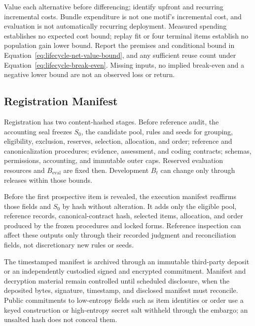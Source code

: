 \documentclass[10pt]{article} %
\providecommand{\1}{\mathbf{1}}  %
\theoremstyle{remark}
\theoremstyle{definition}
\begin{document}
Value each alternative before differencing; identify upfront and recurring
incremental costs. Bundle expenditure is not one motif's incremental cost,
and evaluation is not automatically recurring deployment. Measured spending
establishes no expected cost bound; replay fit or four terminal items establish
no population gain lower bound. Report the premises and conditional bound in
Equation~\ref{eq:lifecycle-net-value-bound}, and any sufficient reuse count
under Equation~\ref{eq:lifecycle-break-even}. Missing inputs, no implied
break-even and a negative lower bound are not an observed loss or return.

\subsection{Registration Manifest}
\label{subsec:ledger-registration}

Registration has two content-hashed stages. Before reference audit, the
accounting seal freezes $S_0$, the candidate pool, rules and seeds for grouping,
eligibility, exclusion, reserves, selection, allocation, and order; reference
and canonicalization procedures; evidence, assessment, and coding contracts;
schemas, permissions, accounting, and immutable outer caps. Reserved evaluation
resources and $B_{\mathrm{eval}}$ are fixed then. Development $B_t$ can change
only through releases within those bounds.

Before the first prospective item is revealed, the execution manifest
reaffirms those fields and $S_0$ by hash without alteration. It adds only the
eligible pool, reference records, canonical-contract hash, selected items,
allocation, and order produced by the frozen procedures and locked forms.
Reference inspection can affect these outputs only through their recorded
judgment and reconciliation fields, not discretionary new rules or seeds.

The timestamped manifest is archived through an immutable third-party deposit
or an independently custodied signed and encrypted commitment. Manifest and
decryption material remain controlled until scheduled disclosure, when the
deposited bytes, signature, timestamp, and disclosed manifest must reconcile.
Public commitments to low-entropy fields such as item identities or order
use a keyed construction or high-entropy secret salt withheld through the
embargo; an unsalted hash does not conceal them.
\end{document}
